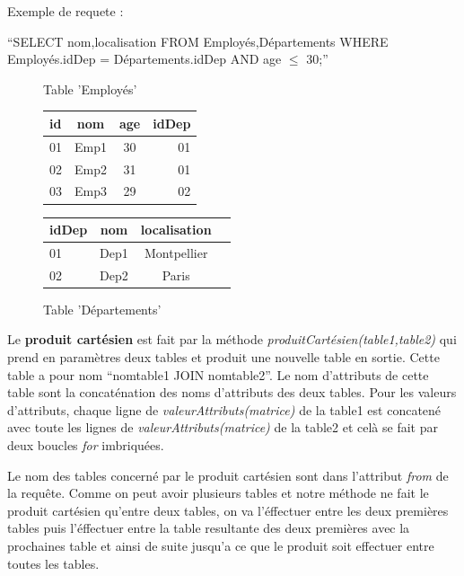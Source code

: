 \documentclass[oneside,13pt,a4paper]{report}
\begin{document}
Exemple de requete :
\begin{center}
	\enquote{SELECT nom,localisation FROM Employés,Départements WHERE Employés.idDep = Départements.idDep AND age $\leq$ 30;}
	\begin{figure}[h]
		\begin{minipage}[c]{.46\linewidth}
			\centering
			\caption{Table 'Employés'}
			\begin{tabular}{|l|c|c|r|}
				\hline
				id & nom  & age & idDep
				\\
				\hline
				01 & Emp1 & 30  & 01    \\
				02 & Emp2 & 31  & 01    \\
				03 & Emp3 & 29  & 02    \\
				\hline
			\end{tabular}
		\end{minipage}
		\hfill%
		\begin{minipage}[c]{.46\linewidth}
			\centering
			\caption{Table 'Départements'}
			\begin{tabular}{|l|c|c|r|}
				\hline
				idDep & nom  & localisation
				\\
				\hline
				01    & Dep1 & Montpellier  \\
				02    & Dep2 & Paris        \\
				\hline
			\end{tabular}
		\end{minipage}
	\end{figure}
\end{center}

Le \textbf{produit cartésien} est fait par la méthode \textit{produitCartésien(table1,table2)} qui prend en paramètres deux tables et produit une nouvelle table en sortie. Cette table a pour nom \enquote{nomtable1 JOIN nomtable2}. Le nom d'attributs de cette table sont la concaténation des noms d'attributs des deux tables. Pour les valeurs d'attributs, chaque ligne de \textit{valeurAttributs(matrice)} de la table1 est concatené avec toute les lignes de \textit{valeurAttributs(matrice)} de la table2 et celà se fait par deux boucles \textit{for} imbriquées.

Le nom des tables concerné par le produit cartésien sont dans l'attribut \textit{from} de la requête. Comme on peut avoir plusieurs tables et notre méthode ne fait le produit cartésien qu'entre deux tables, on va l'éffectuer entre les deux premières tables puis l'éffectuer entre la table resultante des deux premières avec la prochaines table et ainsi de suite jusqu'a ce que le produit soit effectuer entre toutes les tables.
\end{document}
